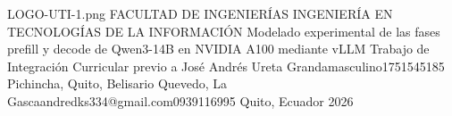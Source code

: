 \documentclass[12pt,a4paper,oneside]{report}
\begin{document}
%
\UTIPortada
{LOGO-UTI-1.png} %
{FACULTAD DE INGENIERÍAS} %
{INGENIERÍA EN TECNOLOGÍAS DE LA INFORMACIÓN} %
{Modelado experimental de las fases prefill y decode de Qwen3-14B en NVIDIA A100 mediante vLLM} %
{Trabajo de Integración Curricular previo a \UTIFraseTituloPortada} %
{\UTIDatosAutores
  {José Andrés Ureta Granda}{masculino}{1751545185}
  {Pichincha, Quito, Belisario Quevedo, La Gasca}{andredks334@gmail.com}{0939116995}} %
{} %
{Quito, Ecuador} %
{2026} %

\UTIFrontMatter


















\UTIMainMatter
\end{document}
